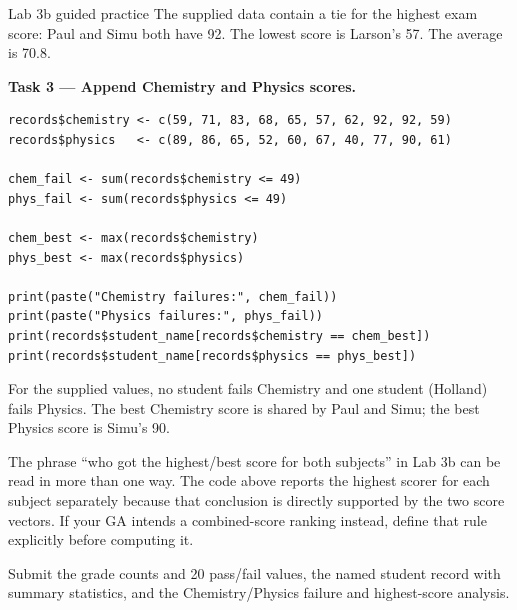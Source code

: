 \begin{labproject}{Lab 3b guided practice}
The supplied data contain a tie for the highest exam score: Paul and Simu both have 92. The lowest score is Larson's 57. The average is 70.8.

\textbf{Task 3 --- Append Chemistry and Physics scores.}

\begin{lstlisting}[style=dsr]
records$chemistry <- c(59, 71, 83, 68, 65, 57, 62, 92, 92, 59)
records$physics   <- c(89, 86, 65, 52, 60, 67, 40, 77, 90, 61)

chem_fail <- sum(records$chemistry <= 49)
phys_fail <- sum(records$physics <= 49)

chem_best <- max(records$chemistry)
phys_best <- max(records$physics)

print(paste("Chemistry failures:", chem_fail))
print(paste("Physics failures:", phys_fail))
print(records$student_name[records$chemistry == chem_best])
print(records$student_name[records$physics == phys_best])
\end{lstlisting}

For the supplied values, no student fails Chemistry and one student (Holland) fails Physics. The best Chemistry score is shared by Paul and Simu; the best Physics score is Simu's 90.

\begin{referencebox}
The phrase ``who got the highest/best score for both subjects'' in Lab 3b can be read in more than one way. The code above reports the highest scorer for each subject separately because that conclusion is directly supported by the two score vectors. If your GA intends a combined-score ranking instead, define that rule explicitly before computing it.
\end{referencebox}
\end{labproject}

\begin{labdeliverable}
Submit the grade counts and 20 pass/fail values, the named student record with summary statistics, and the Chemistry/Physics failure and highest-score analysis.
\end{labdeliverable}
